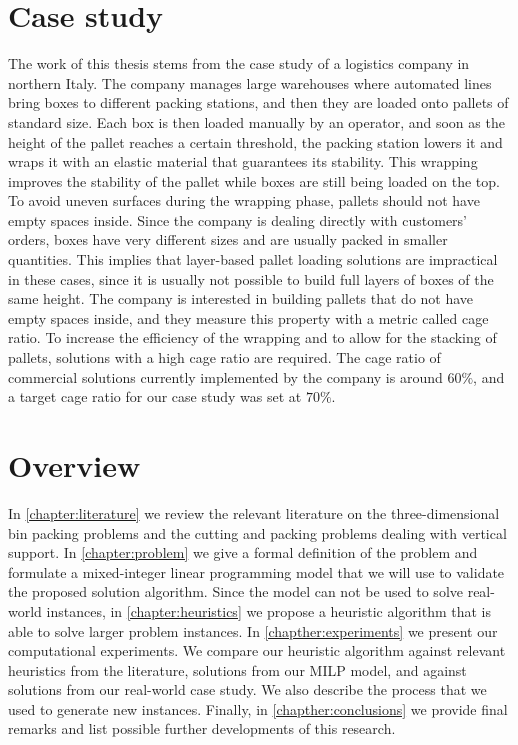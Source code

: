 \section{Case study}
\label{sec:intro:case_study}%
The work of this thesis stems from the case study of a logistics company in northern Italy.
The company manages large warehouses where automated lines bring boxes to different packing stations, and then they are loaded onto pallets of standard size.
Each box is then loaded manually by an operator, and soon as the height of the pallet reaches a certain threshold, the packing station lowers it and wraps it with an elastic material that guarantees its stability.
This wrapping improves the stability of the pallet while boxes are still being loaded on the top. To avoid uneven surfaces during the wrapping phase, pallets should not have empty spaces inside.
Since the company is dealing directly with customers' orders, boxes have very different sizes and are usually packed in smaller quantities. This implies that layer-based pallet loading solutions are impractical in these cases, since it is usually not possible to build full layers of boxes of the same height.
The company is interested in building pallets that do not have empty spaces inside, and they measure this property with a metric called cage ratio.
To increase the efficiency of the wrapping and to allow for the stacking of pallets, solutions with a high cage ratio are required.
The cage ratio of commercial solutions currently implemented by the company is around $60\%$, and a target cage ratio for our case study was set at $70\%$.

\newpage
\section{Overview}
\label{sec:intro:overview}%
In \cref{chapter:literature} we review the relevant literature on the three-dimensional bin packing problems and the cutting and packing problems dealing with vertical support.
In \cref{chapter:problem} we give a formal definition of the problem and formulate a mixed-integer linear programming model that we will use to validate the proposed solution algorithm.
Since the model can not be used to solve real-world instances, in \cref{chapter:heuristics} we propose a heuristic algorithm that is able to solve larger problem instances.
In \cref{chapther:experiments} we present our computational experiments. We compare our heuristic algorithm against relevant heuristics from the literature, solutions from our MILP model, and against solutions from our real-world case study. We also describe the process that we used to generate new instances.
Finally, in \cref{chapther:conclusions} we provide final remarks and list possible further developments of this research.